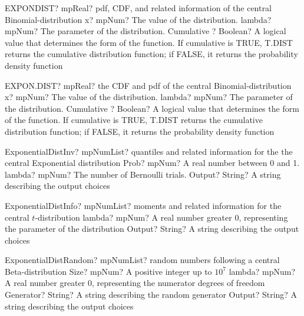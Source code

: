 \documentclass[12pt,a4paper,openany]{book}
\begin{document}
\begin{mpFunctionsExtract}
\mpWorksheetFunctionThreeNotImplemented
{EXPONDIST? mpReal? pdf, CDF, and related information of the central Binomial-distribution}
{x? mpNum? The value of the distribution.}
{lambda? mpNum? The parameter of the distribution.}
{Cumulative ? Boolean? A logical value that determines the form of the function. If cumulative is TRUE, T.DIST returns the cumulative distribution function; if FALSE, it returns the probability density function}
\end{mpFunctionsExtract}

\begin{mpFunctionsExtract}
\mpWorksheetFunctionThreeNotImplemented
{EXPON.DIST? mpReal? the CDF and pdf of the central Binomial-distribution}
{x? mpNum? The value of the distribution.}
{lambda? mpNum? The parameter of the distribution.}
{Cumulative ? Boolean? A logical value that determines the form of the function. If cumulative is TRUE, T.DIST returns the cumulative distribution function; if FALSE, it returns the probability density function}
\end{mpFunctionsExtract}

\begin{mpFunctionsExtract}
\mpFunctionThreeNotImplemented
{ExponentialDistInv? mpNumList? quantiles and related information for the the central Exponential distribution}
{Prob? mpNum? A real number between 0 and 1.}
{lambda? mpNum? The number of Bernoulli trials.}
{Output? String? A string describing the output choices}
\end{mpFunctionsExtract}

\begin{mpFunctionsExtract}
\mpFunctionTwoNotImplemented
{ExponentialDistInfo? mpNumList? moments and related information for the central $t$-distribution}
{lambda? mpNum? A real number greater 0, representing the parameter of the distribution}
{Output? String? A string describing the output choices}
\end{mpFunctionsExtract}

\begin{mpFunctionsExtract}
\mpFunctionFourNotImplemented
{ExponentialDistRandom? mpNumList? random numbers following a central Beta-distribution}
{Size? mpNum? A positive integer up to $10^7$}
{lambda? mpNum? A real number greater 0, representing the numerator  degrees of freedom}
{Generator? String? A string describing the random generator}
{Output? String? A string describing the output choices}
\end{mpFunctionsExtract}
\end{document}

